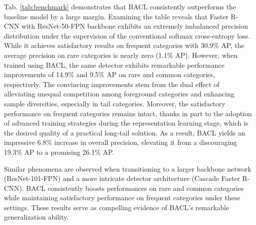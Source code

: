 \documentclass[lettersize,journal]{IEEEtran}
\begin{document}
Tab. \ref{tab:benchmark} demonstrates that BACL consistently outperforms the baseline model by a large margin.
Examining the table reveals that Faster R-CNN with ResNet-50-FPN backbone exhibits an extremely imbalanced precision distribution under the supervision of the conventional softmax cross-entropy loss.
While it achieves satisfactory results on frequent categories with 30.9\% AP, the average precision on rare categories is nearly zero (1.1\% AP).
However, when trained using BACL, the same detector exhibits remarkable performance improvements of 14.9\% and 9.5\% AP on rare and common categories, respectively.
The convincing improvements stem from the dual effect of alleviating unequal competition among foreground categories and enhancing sample diversities, especially in tail categories.
Moreover, the satisfactory performance on frequent categories remains intact, thanks in part to the adoption of advanced training strategies during the representation learning stage, which is the desired quality of a practical long-tail solution.
As a result, BACL yields an impressive 6.8\% increase in overall precision, elevating it from a discouraging 19.3\% AP to a promising 26.1\% AP.

Similar phenomena are observed when transitioning to a larger backbone network (ResNet-101-FPN) and a more intricate detector architecture (Cascade Faster R-CNN).
BACL consistently boosts performances on rare and common categories while maintaining satisfactory performance on frequent categories under these settings.
These results serve as compelling evidence of BACL's remarkable generalization ability.

\vspace{-2mm}
\end{document}
